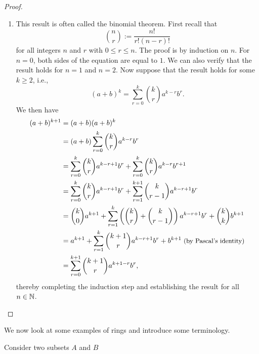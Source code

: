 \begin{proof}
\begin{enumerate}[label=(\alph*), wide]
        \item This result is often called the binomial theorem. First recall that
        \[
            \binom{n}{r} := \frac{n!}{r!(n-r)!}
        \]
        for all integers \(n\) and \(r\) with \(0 \leq r \leq n\). The proof is by induction on \(n\). For \(n = 0\), both sides of the equation are equal to \(1\). We can also verify that the result holds for \(n = 1\) and \(n = 2\). Now suppose that the result holds for some \(k \geq 2\), i.e.,
        \[
            (a + b)^k = \sum_{r = 0}^{k} \binom{k}{r} a^{k-r} b^r.
        \]
        We then have
        \begin{align*}
            (a + b)^{k+1} &= (a + b)(a + b)^k\\
            &= (a + b)\sum_{r = 0}^{k} \binom{k}{r} a^{k-r} b^r\\
            &= \sum_{r = 0}^{k} \binom{k}{r} a^{k-r+1} b^r + \sum_{r = 0}^{k} \binom{k}{r} a^{k-r} b^{r+1}\\
            &= \sum_{r = 0}^{k} \binom{k}{r} a^{k-r+1} b^r + \sum_{r = 1}^{k+1} \binom{k}{r-1} a^{k-r+1} b^r\\
            &= \binom{k}{0} a^{k+1} + \sum_{r = 1}^{k} \left(\binom{k}{r} + \binom{k}{r-1}\right) a^{k-r+1} b^r + \binom{k}{k} b^{k+1}\\
            &= a^{k+1} + \sum_{r = 1}^{k} \binom{k+1}{r} a^{k-r+1} b^r + b^{k+1} {\small \text{  (by Pascal's identity)}}\\
            &= \sum_{r = 0}^{k+1} \binom{k+1}{r} a^{k+1-r} b^r,
        \end{align*}
        thereby completing the induction step and establishing the result for all \(n \in \mathbb{N}\).
    \end{enumerate}
\end{proof}

We now look at some examples of rings and introduce some terminology.

\begin{example}
    Consider two subsets \(A\) and \(B\)
\end{example}

